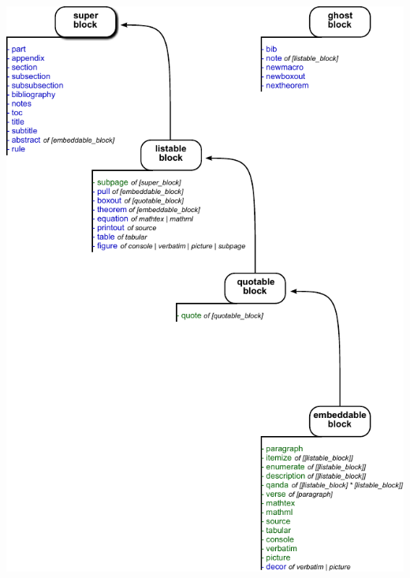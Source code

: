 \documentclass[9pt]{extarticle}
\begin{document}
\begin{center}
\centering
\includegraphics[height=25cm]{hierarchy.pdf}
\end{center}
\end{document}

